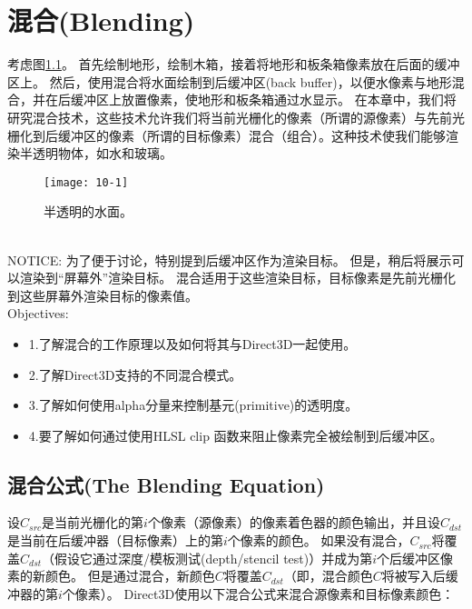 \chapter{混合(Blending)}
\begin{flushleft}
考虑图\ref{fig:10-1}。 首先绘制地形，绘制木箱，接着将地形和板条箱像素放在后面的缓冲区上。 然后，使用混合将水面绘制到后缓冲区(back buffer)，以便水像素与地形混合，并在后缓冲区上放置像素，使地形和板条箱通过水显示。 在本章中，我们将研究混合技术，这些技术允许我们将当前光栅化的像素（所谓的源像素）与先前光栅化到后缓冲区的像素（所谓的目标像素）混合（组合）。这种技术使我们能够渲染半透明物体，如水和玻璃。\\
\end{flushleft}

\begin{figure}[h]
    \label{fig:10-1}
    \texttt{[image: 10-1]}
    \centering
    \caption{半透明的水面。}
\end{figure}

\begin{flushleft}
~\\
NOTICE: 为了便于讨论，特别提到后缓冲区作为渲染目标。 但是，稍后将展示可以渲染到“屏幕外”渲染目标。 混合适用于这些渲染目标，目标像素是先前光栅化到这些屏幕外渲染目标的像素值。
~\\
{\large Objectives:}
\begin{itemize}
    \item 1.了解混合的工作原理以及如何将其与Direct3D一起使用。
    \item 2.了解Direct3D支持的不同混合模式。
    \item 3.了解如何使用alpha分量来控制基元(primitive)的透明度。
    \item 4.要了解如何通过使用HLSL clip 函数来阻止像素完全被绘制到后缓冲区。
\end{itemize}
\end{flushleft}

\section{混合公式(The Blending Equation)}
\begin{flushleft}
设$C_{src}$是当前光栅化的第$i$个像素（源像素）的像素着色器的颜色输出，并且设$C_{dst}$是当前在后缓冲器（目标像素）上的第$i$个像素的颜色。 如果没有混合，$C_{src}$将覆盖$C_{dst}$（假设它通过深度/模板测试(depth/stencil test)）并成为第$i$个后缓冲区像素的新颜色。 但是通过混合，新颜色$C$将覆盖$C_{dst}$（即，混合颜色$C$将被写入后缓冲器的第$i$个像素）。 Direct3D使用以下混合公式来混合源像素和目标像素颜色：\\
\end{flushleft}

